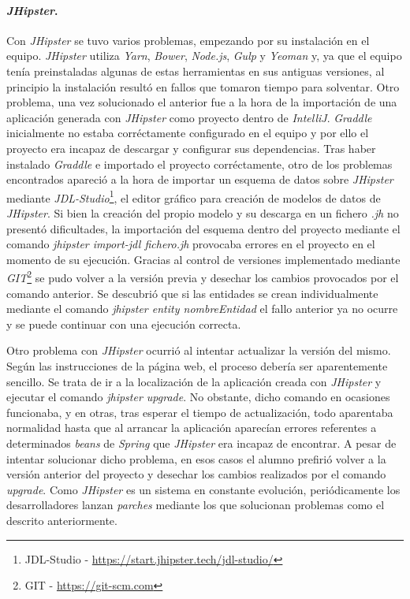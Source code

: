 \paragraph*{\textit{JHipster}.} Con \textit{JHipster} se tuvo varios problemas, empezando por su instalación en el equipo. \textit{JHipster} utiliza \textit{Yarn}, \textit{Bower}, \textit{Node.js}, \textit{Gulp} y \textit{Yeoman} y, ya que el equipo tenía preinstaladas algunas de estas herramientas en sus antiguas versiones, al principio la instalación resultó en fallos que tomaron tiempo para solventar. Otro problema, una vez solucionado el anterior fue a la hora de la importación de una aplicación generada con \textit{JHipster} como proyecto dentro de \textit{IntelliJ}. \textit{Graddle} inicialmente no estaba corréctamente configurado en el equipo y por ello el proyecto era incapaz de descargar y configurar sus dependencias. Tras haber instalado \textit{Graddle} e importado el proyecto corréctamente, otro de los problemas encontrados apareció a la hora de importar un esquema de datos sobre \textit{JHipster} mediante \textit{JDL-Studio}\footnote{JDL-Studio - \url{https://start.jhipster.tech/jdl-studio/}}, el editor gráfico para creación de modelos de datos de \textit{JHipster}. Si bien la creación del propio modelo y su descarga en un fichero  \textit{.jh} no presentó dificultades, la importación del esquema dentro del proyecto mediante el comando \textit{jhipster import-jdl fichero.jh} provocaba errores en el proyecto en el momento de su ejecución. Gracias al control de versiones implementado mediante \textit{GIT}\footnote{GIT - \url{https://git-scm.com}} se pudo volver a la versión previa y desechar los cambios provocados por el comando anterior. Se descubrió que si las entidades se crean individualmente mediante el comando \textit{jhipster entity nombreEntidad} el fallo anterior ya no ocurre y se puede continuar con una ejecución correcta. 
\par 
Otro problema con \textit{JHipster} ocurrió al intentar actualizar la versión del mismo. Según las instrucciones de la página web, el proceso debería ser aparentemente sencillo. Se trata de ir a la localización de la aplicación creada con \textit{JHipster} y ejecutar el comando \textit{jhipster upgrade}. No obstante, dicho comando en ocasiones funcionaba, y en otras, tras esperar el tiempo de actualización, todo aparentaba normalidad hasta que al arrancar la aplicación aparecían errores referentes a determinados \textit{beans} de \textit{Spring} que \textit{JHipster} era incapaz de encontrar. A pesar de intentar solucionar dicho problema, en esos casos el alumno prefirió volver a la versión anterior del proyecto y desechar los cambios realizados por el comando \textit{upgrade}. Como \textit{JHipster} es un sistema en constante evolución, periódicamente los desarrolladores lanzan \textit{parches} mediante los que solucionan problemas como el descrito anteriormente. 

